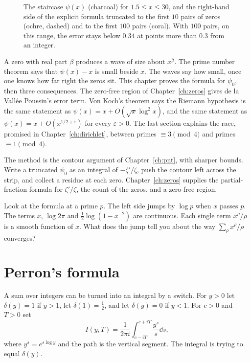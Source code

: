 \begin{figure}[ht]
\centering
{}
\caption{The staircase $\psi(x)$ (charcoal) for $1.5\le x\le30$, and the right-hand side of the explicit formula truncated to the first $10$ pairs of zeros (ochre, dashed) and to the first $100$ pairs (coral). With $100$ pairs, on this range, the error stays below $0.34$ at points more than $0.3$ from an integer.}
\label{fig:explicit}
\end{figure}

A zero with real part $\beta$ produces a wave of size about $x^\beta$. The prime number theorem says that $\psi(x)-x$ is small beside $x$. The waves say how small, once one knows how far right the zeros sit. This chapter proves the formula for $\psi_0$, then three consequences. The zero-free region of Chapter~\ref{ch:zeros} gives de la Vallée Poussin's error term. Von Koch's theorem says the Riemann hypothesis is the same statement as $\psi(x)=x+O(\sqrt x\log^2x)$, and the same statement as $\psi(x)=x+O(x^{1/2+\varepsilon})$ for every $\varepsilon>0$. The last section explains the race, promised in Chapter~\ref{ch:dirichlet}, between primes $\equiv3\pmod4$ and primes $\equiv1\pmod4$.

The method is the contour argument of Chapter~\ref{ch:pnt}, with sharper bounds. Write a truncated $\psi_0$ as an integral of $-\zeta'/\zeta$, push the contour left across the strip, and collect a residue at each zero. Chapter~\ref{ch:zeros} supplies the partial-fraction formula for $\zeta'/\zeta$, the count of the zeros, and a zero-free region.

\begin{think}
Look at the formula at a prime $p$. The left side jumps by $\log p$ when $x$ passes $p$. The terms $x$, $\log2\pi$ and $\frac12\log(1-x^{-2})$ are continuous. Each single term $x^\rho/\rho$ is a smooth function of $x$. What does the jump tell you about the way $\sum_\rho x^\rho/\rho$ converges?
\end{think}

\section{Perron's formula}

A sum over integers can be turned into an integral by a switch. For $y>0$ let $\delta(y)=1$ if $y>1$, let $\delta(1)=\frac12$, and let $\delta(y)=0$ if $y<1$. For $c>0$ and $T>0$ set
\[
I(y,T)=\frac1{2\pi i}\int_{c-iT}^{c+iT}\frac{y^s}s\dd s,
\]
where $y^s=e^{s\log y}$ and the path is the vertical segment. The integral is trying to equal $\delta(y)$.

